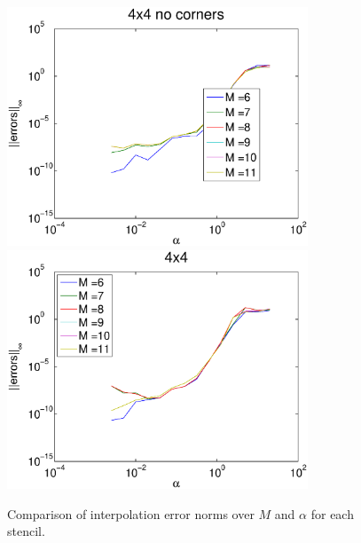 \documentclass{report}
\begin{document}
\begin{figure}
  \begin{center}
    \includegraphics[width=0.8\textwidth]{figs/interpolation/error_norms_1.eps}
    \linebreak
    \includegraphics[width=0.8\textwidth]{figs/interpolation/error_norms_2.eps}
    \caption{Comparison of interpolation error norms over $M$ and $\alpha$ for each stencil.}
    \label{fig:errors_all}
  \end{center}
\end{figure}
\end{document}
